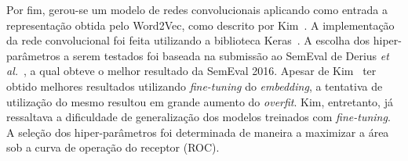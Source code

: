 Por fim, gerou-se um modelo de redes convolucionais aplicando como entrada a representação obtida pelo Word2Vec, como
descrito por Kim~\cite{kim14}.
A implementação da rede convolucional foi feita utilizando a biblioteca Keras~\cite{keras}.
A escolha dos hiper-parâmetros a serem testados foi baseada na submissão ao SemEval de Derius
\textit{et al.}~\cite{deriu16}, a qual obteve o melhor resultado da SemEval 2016.
Apesar de Kim~\cite{kim14} ter obtido melhores resultados utilizando \textit{fine-tuning} do \textit{embedding}, a
tentativa de utilização do mesmo resultou em grande aumento do \textit{overfit}.
Kim, entretanto, já ressaltava a dificuldade de generalização dos modelos treinados com \textit{fine-tuning}.
A seleção dos hiper-parâmetros foi determinada de maneira a maximizar a área sob a curva de operação do receptor (ROC).

